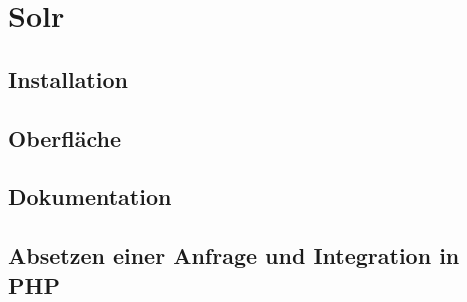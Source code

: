 
\section{Solr}

\subsection{Installation}

\subsection{Oberfläche}

\subsection{Dokumentation}

\subsection{Absetzen einer Anfrage und Integration in PHP}